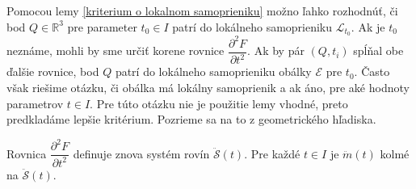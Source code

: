 Pomocou lemy \ref{kriterium o lokalnom samoprieniku} možno ľahko rozhodnúť, či bod $Q \in \mathbb{R}^3$ pre parameter $t_0 \in I$ patrí do lokálneho samoprieniku $\mathcal{L}_{t_0}.$ Ak je $t_0$ neznáme, mohli by sme určiť korene rovnice $\dfrac{\partial^2 F}{\partial t^2}$. Ak by pár $(Q, t_i)$ spĺňal obe ďalšie rovnice, bod $Q$ patrí do lokálneho samoprieniku obálky $\mathcal{E}$ pre $t_0.$
Často však riešime otázku, či obálka má lokálny samoprienik a ak áno, pre aké hodnoty parametrov $t \in I$. Pre túto otázku nie je použitie lemy vhodné, preto predkladáme lepšie kritérium. Pozrieme sa na to z geometrického hľadiska.

Rovnica $\dfrac{\partial^2 F}{\partial t^2}$ definuje znova systém rovín $\mathcal{\ddot{S}}(t)$. Pre každé $t \in I$ je $\ddot{m}(t)$ kolmé na $\mathcal{\ddot{S}}(t).$


